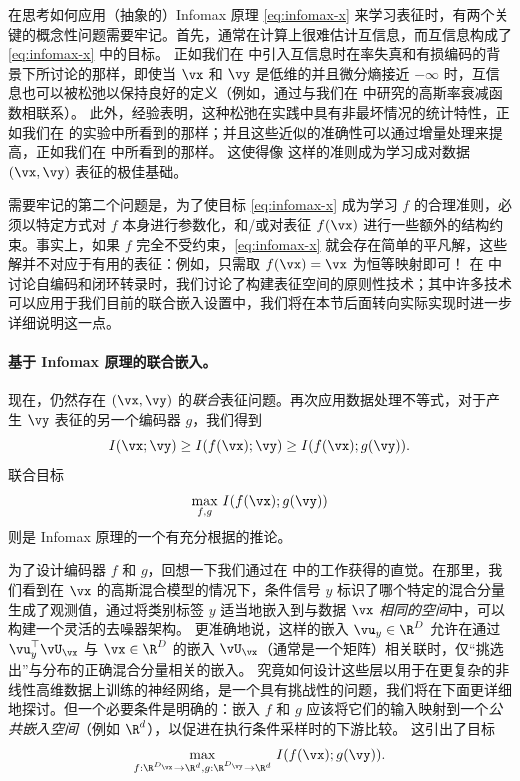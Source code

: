 \documentclass[../../book-main_zh.tex]{subfiles}
\begin{document}
在思考如何应用（抽象的）Infomax 原理 \eqref{eq:infomax-x} 来学习表征时，有两个关键的概念性问题需要牢记。首先，通常在计算上很难估计互信息，而互信息构成了
\eqref{eq:infomax-x} 中的目标。
正如我们在  中引入互信息时在率失真和有损编码的背景下所讨论的那样，即使当 $\vx$ 和 $\vy$ 是低维的并且微分熵接近 $-\infty$ 时，互信息也可以被松弛以保持良好的定义（例如，通过与我们在
 中研究的高斯率衰减函数相联系）。
此外，经验表明，这种松弛在实践中具有非最坏情况的统计特性，正如我们在
 的实验中所看到的那样；并且这些近似的准确性可以通过增量处理来提高，正如我们在  中所看到的那样。
这使得像  这样的准则成为学习成对数据 $(\vx, \vy)$ 表征的极佳基础。

需要牢记的第二个问题是，为了使目标 \eqref{eq:infomax-x} 成为学习 $f$ 的合理准则，必须以特定方式对 $f$ 本身进行参数化，和/或对表征 $f(\vx)$ 进行一些额外的结构约束。事实上，如果 $f$ 完全不受约束，\eqref{eq:infomax-x} 就会存在简单的平凡解，这些解并不对应于有用的表征：例如，只需取 $f(\vx) = \vx$ 为恒等映射即可！
在  中讨论自编码和闭环转录时，我们讨论了构建表征空间的原则性技术；其中许多技术可以应用于我们目前的联合嵌入设置中，我们将在本节后面转向实际实现时进一步详细说明这一点。

\paragraph{基于 Infomax 原理的联合嵌入。}

现在，仍然存在 $(\vx, \vy)$ 的\textit{联合}表征问题。再次应用数据处理不等式，对于产生 $\vy$ 表征的另一个编码器 $g$，我们得到
\begin{equation*}
    I(\vx; \vy) \geq I(f(\vx); \vy) \geq I(f(\vx); g(\vy)).
\end{equation*}
联合目标
\begin{equation}\label{eq:infomax-x-y}
    \max_{f, g}\, I(f(\vx); g(\vy))
\end{equation}
则是 Infomax 原理的一个有充分根据的推论。

为了设计编码器 $f$ 和 $g$，回想一下我们通过在
 中的工作获得的直觉。在那里，我们看到在 $\vx$ 的高斯混合模型的情况下，条件信号 $y$ 标识了哪个特定的混合分量生成了观测值，通过将类别标签 $y$ 适当地嵌入到与数据 $\vx$ \textit{相同的空间}中，可以构建一个灵活的去噪器架构。
更准确地说，这样的嵌入 $\vu_y \in \R^D$ 允许在通过 $\vu_y^\top
\vU_{\vx}$ 与 $\vx \in \R^{D}$ 的嵌入 $\vU_{\vx}$（通常是一个矩阵）相关联时，仅“挑选出”与分布的正确混合分量相关的嵌入。
究竟如何设计这些层以用于在更复杂的非线性高维数据上训练的神经网络，是一个具有挑战性的问题，我们将在下面更详细地探讨。但一个必要条件是明确的：嵌入
$f$ 和 $g$ 应该将它们的输入映射到一个\textit{公共嵌入空间}（例如 $\R^d$），以促进在执行条件采样时的下游比较。
这引出了目标
\begin{equation}\label{eq:infomax-joint}
    \max_{f : \R^{D_{\vx}} \to \R^{d}, g: \R^{D_{\vy}} \to \R^d}\,
    I(f(\vx); g(\vy)).
\end{equation}
\end{document}
